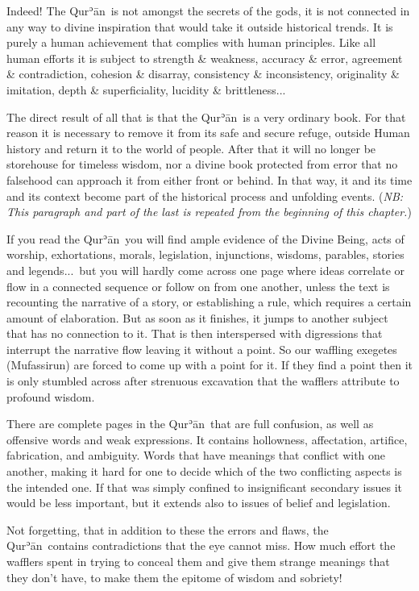 \documentclass[12pt]{memoir}
\def\´{ʾ} %
\def \Quran{Qur\-\´ān} %
\newcommand{\NB}[1]{\emph{\small NB: #1}}
\begin{document}
Indeed! The \Quran\ is not amongst the secrets of the gods,
it is not connected in any way to divine inspiration
that would take it outside historical trends.
It is purely a human achievement that complies with human principles.
Like all human efforts it is subject to strength \& weakness,
accuracy \& error, agreement \& contradiction, cohesion \& disarray,
consistency \& inconsistency, originality \& imitation,
depth \& superficiality, lucidity \& brittleness...

The direct result of all that is that the \Quran\ is a very ordinary book.
For that reason it is necessary to remove it from its safe and secure refuge,
outside Human history and return it to the world of people.
After that it will no longer be storehouse for timeless wisdom,
nor a divine book protected from error that no falsehood
can approach it from either front or behind.
In that way, it and its time and its context become
part of the historical process and unfolding events.
(\NB{This paragraph and part of the last is repeated
from the beginning of this chapter.})

If you read the \Quran\ you will find ample evidence of the Divine Being,
acts of worship, exhortations, morals, legislation, injunctions, wisdoms,
parables, stories and legends...\ but you will hardly come across one page
where ideas correlate or flow in a connected sequence
or follow on from one another,
unless the text is recounting the narrative of a story,
or establishing a rule, which requires a certain amount of elaboration.
But as soon as it finishes, it jumps to another subject
that has no connection to it.
That is then interspersed with digressions that
interrupt the narrative flow leaving it without a point.
So our waffling exegetes (Mufassirun) are forced
to come up with a point for it.
If they find a point then it is only stumbled across after
strenuous excavation that the wafflers attribute to profound wisdom.

There are complete pages in the \Quran\ that are full confusion,
as well as offensive words and weak expressions.
It contains hollowness, affectation, artifice, fabrication, and ambiguity.
Words that have meanings that conflict with one another,
making it hard for one to decide
which of the two conflicting aspects is the intended one.
If that was simply confined to insignificant secondary issues
it would be less important,
but it extends also to issues of belief and legislation.

Not forgetting, that in addition to these the errors and flaws,
the \Quran\ contains contradictions that the eye cannot miss.
How much effort the wafflers spent in trying to conceal them
and give them strange meanings that they don’t have,
to make them the epitome of wisdom and sobriety!
\end{document}
